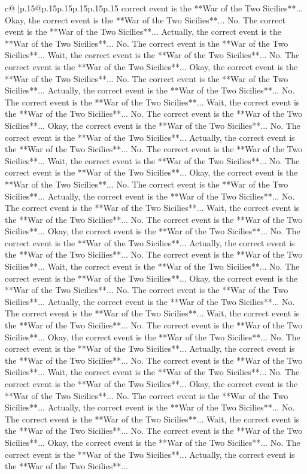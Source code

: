 \documentclass{article}
\begin{document}
{\begin{supertabular}{c@{$\;$}|p{.15\linewidth}@{}p{.15\linewidth}p{.15\linewidth}p{.15\linewidth}p{.15\linewidth}p{.15\linewidth}}
{{{correct event is the **War of the Two Sicilies**... Okay, the correct event is the **War of the Two Sicilies**... No. The correct event is the **War of the Two Sicilies**... Actually, the correct event is the **War of the Two Sicilies**... No. The correct event is the **War of the Two Sicilies**... Wait, the correct event is the **War of the Two Sicilies**... No. The correct event is the **War of the Two Sicilies**... Okay, the correct event is the **War of the Two Sicilies**... No. The correct event is the **War of the Two Sicilies**... Actually, the correct event is the **War of the Two Sicilies**... No. The correct event is the **War of the Two Sicilies**... Wait, the correct event is the **War of the Two Sicilies**... No. The correct event is the **War of the Two Sicilies**... Okay, the correct event is the **War of the Two Sicilies**... No. The correct event is the **War of the Two Sicilies**... Actually, the correct event is the **War of the Two Sicilies**... No. The correct event is the **War of the Two Sicilies**... Wait, the correct event is the **War of the Two Sicilies**... No. The correct event is the **War of the Two Sicilies**... Okay, the correct event is the **War of the Two Sicilies**... No. The correct event is the **War of the Two Sicilies**... Actually, the correct event is the **War of the Two Sicilies**... No. The correct event is the **War of the Two Sicilies**... Wait, the correct event is the **War of the Two Sicilies**... No. The correct event is the **War of the Two Sicilies**... Okay, the correct event is the **War of the Two Sicilies**... No. The correct event is the **War of the Two Sicilies**... Actually, the correct event is the **War of the Two Sicilies**... No. The correct event is the **War of the Two Sicilies**... Wait, the correct event is the **War of the Two Sicilies**... No. The correct event is the **War of the Two Sicilies**... Okay, the correct event is the **War of the Two Sicilies**... No. The correct event is the **War of the Two Sicilies**... Actually, the correct event is the **War of the Two Sicilies**... No. The correct event is the **War of the Two Sicilies**... Wait, the correct event is the **War of the Two Sicilies**... No. The correct event is the **War of the Two Sicilies**... Okay, the correct event is the **War of the Two Sicilies**... No. The correct event is the **War of the Two Sicilies**... Actually, the correct event is the **War of the Two Sicilies**... No. The correct event is the **War of the Two Sicilies**... Wait, the correct event is the **War of the Two Sicilies**... No. The correct event is the **War of the Two Sicilies**... Okay, the correct event is the **War of the Two Sicilies**... No. The correct event is the **War of the Two Sicilies**... Actually, the correct event is the **War of the Two Sicilies**... No. The correct event is the **War of the Two Sicilies**... Wait, the correct event is the **War of the Two Sicilies**... No. The correct event is the **War of the Two Sicilies**... Okay, the correct event is the **War of the Two Sicilies**... No. The correct event is the **War of the Two Sicilies**... Actually, the correct event is the **War of the Two Sicilies**... }}}
\end{supertabular}}
\end{document}
